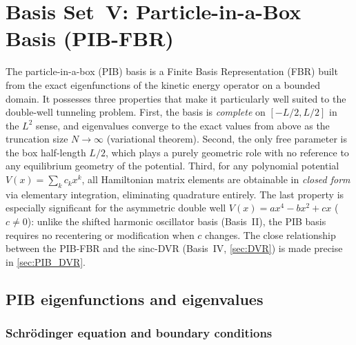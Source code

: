 \section{Basis Set~V: Particle-in-a-Box Basis (PIB-FBR)}\label{sec:PIB}

The particle-in-a-box (PIB) basis is a Finite Basis Representation (FBR) built from
the exact eigenfunctions of the kinetic energy operator on a bounded domain.
It possesses three properties that make it particularly well suited to the double-well
tunneling problem.  First, the basis is \emph{complete} on $[-L/2, L/2]$ in the
$L^2$ sense, and eigenvalues converge to the exact values from above as the truncation
size $N\to\infty$ (variational theorem).  Second, the only free parameter is the
box half-length $L/2$, which plays a purely geometric role with no reference to
any equilibrium geometry of the potential.  Third, for any polynomial potential
$V(x) = \sum_k c_k x^k$, all Hamiltonian matrix elements are obtainable in
\emph{closed form} via elementary integration, eliminating quadrature entirely.
The last property is especially significant for the asymmetric double well
$V(x) = ax^4 - bx^2 + cx$ ($c \neq 0$): unlike the shifted harmonic oscillator
basis (Basis~II), the PIB basis requires no recentering or modification when $c$
changes.  The close relationship between the PIB-FBR and the sinc-DVR (Basis~IV,
\cref{sec:DVR}) is made precise in \cref{sec:PIB_DVR}.

\subsection{PIB eigenfunctions and eigenvalues}\label{sec:PIB_wf}

\subsubsection{Schrödinger equation and boundary conditions}

